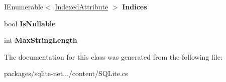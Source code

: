 \begin{DoxyCompactItemize}
\item 
\hypertarget{classSQLite_1_1TableMapping_1_1Column_a5153b02c01f808c46d83f1bccc23aa40}{}I\+Enumerable$<$ \hyperlink{classSQLite_1_1IndexedAttribute}{Indexed\+Attribute} $>$ {\bfseries Indices}\label{classSQLite_1_1TableMapping_1_1Column_a5153b02c01f808c46d83f1bccc23aa40}

\item 
\hypertarget{classSQLite_1_1TableMapping_1_1Column_a2ff8d12dcf449ca9407c4c3222521c96}{}bool {\bfseries Is\+Nullable}\label{classSQLite_1_1TableMapping_1_1Column_a2ff8d12dcf449ca9407c4c3222521c96}

\item 
\hypertarget{classSQLite_1_1TableMapping_1_1Column_a762d97a3a799c0f7a31b034eb0f3db71}{}int {\bfseries Max\+String\+Length}\label{classSQLite_1_1TableMapping_1_1Column_a762d97a3a799c0f7a31b034eb0f3db71}

\end{DoxyCompactItemize}


The documentation for this class was generated from the following file\+:\begin{DoxyCompactItemize}
\item 
packages/sqlite-\/net.../content/S\+Q\+Lite.\+cs\end{DoxyCompactItemize}
